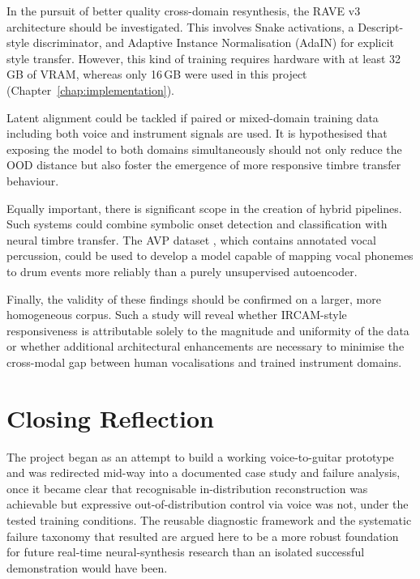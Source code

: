 \documentclass[a4paper,11pt,oneside,openany]{book}
\begin{document}
In the pursuit of better quality cross-domain resynthesis, the RAVE v3 architecture should be investigated. This involves Snake activations, a Descript-style discriminator, and Adaptive Instance Normalisation (AdaIN) for explicit style transfer. However, this kind of training requires hardware with at least 32\,GB of VRAM, whereas only 16\,GB were used in this project (Chapter~\ref{chap:implementation}).

Latent alignment could be tackled if paired or mixed-domain training data including both voice and instrument signals are used. It is hypothesised that exposing the model to both domains simultaneously should not only reduce the OOD distance but also foster the emergence of more responsive timbre transfer behaviour.

Equally important, there is significant scope in the creation of hybrid pipelines. Such systems could combine symbolic onset detection and classification with neural timbre transfer. The AVP dataset \parencite{delgado2019avp}, which contains annotated vocal percussion, could be used to develop a model capable of mapping vocal phonemes to drum events more reliably than a purely unsupervised autoencoder.

Finally, the validity of these findings should be confirmed on a larger, more homogeneous corpus. Such a study will reveal whether IRCAM-style responsiveness is attributable solely to the magnitude and uniformity of the data or whether additional architectural enhancements are necessary to minimise the cross-modal gap between human vocalisations and trained instrument domains.

\section{Closing Reflection}\label{sec:closing}

The project began as an attempt to build a working voice-to-guitar prototype and was redirected mid-way into a documented case study and failure analysis, once it became clear that recognisable in-distribution reconstruction was achievable but expressive out-of-distribution control via voice was not, under the tested training conditions. The reusable diagnostic framework and the systematic failure taxonomy that resulted are argued here to be a more robust foundation for future real-time neural-synthesis research than an isolated successful demonstration would have been.

\printbibliography[heading=bibintoc, title={References}]
\end{document}
